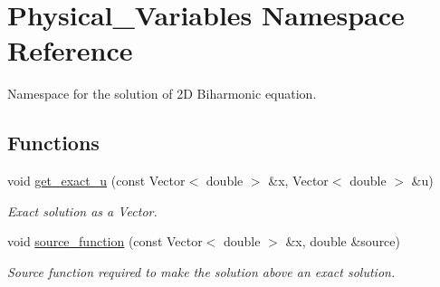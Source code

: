 \hypertarget{namespacePhysical__Variables}{}\section{Physical\+\_\+\+Variables Namespace Reference}
\label{namespacePhysical__Variables}


Namespace for the solution of 2D Biharmonic equation.  


\subsection*{Functions}
\begin{DoxyCompactItemize}
\item 
void \hyperlink{namespacePhysical__Variables_af90d0c580c57b1152fd1cc7046055031}{get\+\_\+exact\+\_\+u} (const Vector$<$ double $>$ \&x, Vector$<$ double $>$ \&u)
\begin{DoxyCompactList}\small\item\em Exact solution as a Vector. \end{DoxyCompactList}\item 
void \hyperlink{namespacePhysical__Variables_ae11027d76c5f512b7db6a1b6d17dc792}{source\+\_\+function} (const Vector$<$ double $>$ \&x, double \&source)
\begin{DoxyCompactList}\small\item\em Source function required to make the solution above an exact solution. \end{DoxyCompactList}\end{DoxyCompactItemize}
